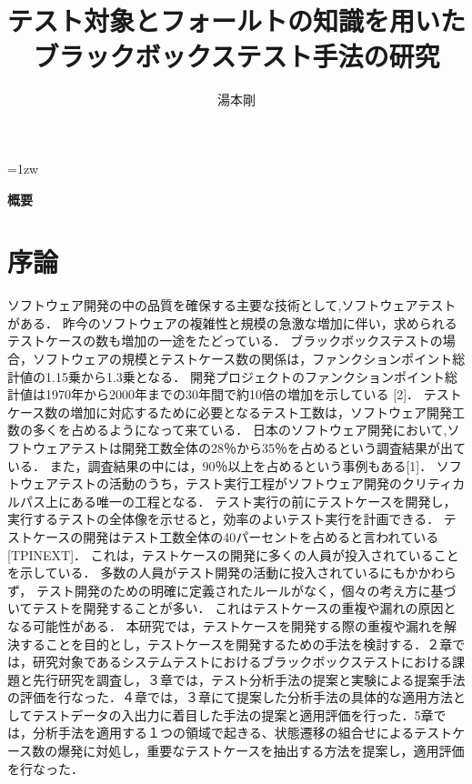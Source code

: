 \documentclass[a4paper,12pt]{jreport}
\title{テスト対象とフォールトの知識を用いたブラックボックステスト手法の研究}
\author{湯本剛}
\begin{document}
\maketitle
\thispagestyle{empty}
\newpage

\thispagestyle{empty}
\vspace*{20pt plus 1fil}
\parindent=1zw
\noindent
\begin{center}
{\bf 概要}
\vspace{5mm}
\end{center}

\par
\vspace{0pt plus 1fil}
\newpage

\tableofcontents
\listoffigures

\pagebreak \setcounter{page}{1}

\chapter{序論}
ソフトウェア開発の中の品質を確保する主要な技術として,ソフトウェアテストがある．
昨今のソフトウェアの複雑性と規模の急激な増加に伴い，求められるテストケースの数も増加の一途をたどっている．
ブラックボックステストの場合，ソフトウェアの規模とテストケース数の関係は，ファンクションポイント総計値の1.15乗から1.3乗となる．
開発プロジェクトのファンクションポイント総計値は1970年から2000年までの30年間で約10倍の増加を示している [2]．
テストケース数の増加に対応するために必要となるテスト工数は，ソフトウェア開発工数の多くを占めるようになって来ている．
日本のソフトウェア開発において,ソフトウェアテストは開発工数全体の28％から35％を占めるという調査結果が出ている．
また，調査結果の中には，90％以上を占めるという事例もある[1]．
ソフトウェアテストの活動のうち，テスト実行工程がソフトウェア開発のクリティカルパス上にある唯一の工程となる．
テスト実行の前にテストケースを開発し，実行するテストの全体像を示せると，効率のよいテスト実行を計画できる．
テストケースの開発はテスト工数全体の40パーセントを占めると言われている[TPINEXT]．
これは，テストケースの開発に多くの人員が投入されていることを示している．
多数の人員がテスト開発の活動に投入されているにもかかわらず， テスト開発のための明確に定義されたルールがなく，個々の考え方に基づいてテストを開発することが多い．
これはテストケースの重複や漏れの原因となる可能性がある．
本研究では，テストケースを開発する際の重複や漏れを解決することを目的とし，テストケースを開発するための手法を検討する．２章では，研究対象であるシステムテストにおけるブラックボックステストにおける課題と先行研究を調査し，３章では，テスト分析手法の提案と実験による提案手法の評価を行なった．４章では，３章にて提案した分析手法の具体的な適用方法としてテストデータの入出力に着目した手法の提案と適用評価を行った．5章では，分析手法を適用する１つの領域で起きる、状態遷移の組合せによるテストケース数の爆発に対処し，重要なテストケースを抽出する方法を提案し，適用評価を行なった．
\end{document}
